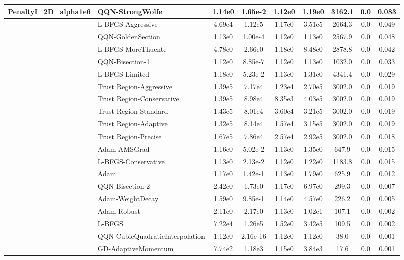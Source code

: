 \documentclass[10pt]{article}
\begin{document}
\begin{longtable}{|l|l|c|c|c|c|c|c|c|}
PenaltyI\_2D\_alpha1e6 & \textbf{QQN-StrongWolfe} & 1.14e0 & 1.65e-2 & 1.12e0 & 1.19e0 & 3162.1 & 0.0 & 0.083 \\
\hline
 & L-BFGS-Aggressive & 4.69e4 & 1.12e5 & 1.17e0 & 3.51e5 & 2664.3 & 0.0 & 0.049 \\
\hline
 & QQN-GoldenSection & 1.13e0 & 1.00e-4 & 1.12e0 & 1.13e0 & 2567.9 & 0.0 & 0.048 \\
\hline
 & L-BFGS-MoreThuente & 4.78e0 & 2.66e0 & 1.18e0 & 8.48e0 & 2878.8 & 0.0 & 0.042 \\
\hline
 & QQN-Bisection-1 & 1.12e0 & 8.85e-7 & 1.12e0 & 1.13e0 & 1032.0 & 0.0 & 0.033 \\
\hline
 & L-BFGS-Limited & 1.18e0 & 5.23e-2 & 1.13e0 & 1.31e0 & 4341.4 & 0.0 & 0.029 \\
\hline
 & Trust Region-Aggressive & 1.39e5 & 7.17e4 & 1.23e4 & 2.70e5 & 3002.0 & 0.0 & 0.019 \\
\hline
 & Trust Region-Conservative & 1.39e5 & 8.98e4 & 8.35e3 & 4.03e5 & 3002.0 & 0.0 & 0.019 \\
\hline
 & Trust Region-Standard & 1.43e5 & 8.01e4 & 3.60e4 & 3.21e5 & 3002.0 & 0.0 & 0.019 \\
\hline
 & Trust Region-Adaptive & 1.32e5 & 8.14e4 & 1.57e4 & 3.15e5 & 3002.0 & 0.0 & 0.019 \\
\hline
 & Trust Region-Precise & 1.67e5 & 7.86e4 & 2.57e4 & 2.92e5 & 3002.0 & 0.0 & 0.018 \\
\hline
 & Adam-AMSGrad & 1.16e0 & 5.02e-2 & 1.13e0 & 1.35e0 & 647.9 & 0.0 & 0.015 \\
\hline
 & L-BFGS-Conservative & 1.13e0 & 2.13e-2 & 1.12e0 & 1.22e0 & 1183.8 & 0.0 & 0.015 \\
\hline
 & Adam & 1.17e0 & 1.42e-1 & 1.13e0 & 1.79e0 & 625.9 & 0.0 & 0.012 \\
\hline
 & QQN-Bisection-2 & 2.42e0 & 1.73e0 & 1.17e0 & 6.97e0 & 299.3 & 0.0 & 0.007 \\
\hline
 & Adam-WeightDecay & 1.59e0 & 9.85e-1 & 1.14e0 & 4.57e0 & 226.2 & 0.0 & 0.005 \\
\hline
 & Adam-Robust & 2.11e0 & 2.17e0 & 1.13e0 & 1.02e1 & 107.1 & 0.0 & 0.002 \\
\hline
 & L-BFGS & 7.22e4 & 1.26e5 & 1.52e0 & 3.42e5 & 109.5 & 0.0 & 0.002 \\
\hline
 & QQN-CubicQuadraticInterpolation & 1.12e0 & 2.16e-16 & 1.12e0 & 1.12e0 & 38.0 & 0.0 & 0.001 \\
\hline
 & GD-AdaptiveMomentum & 7.74e2 & 1.18e3 & 1.15e0 & 3.84e3 & 17.6 & 0.0 & 0.001 \\

\end{longtable}
\end{document}
